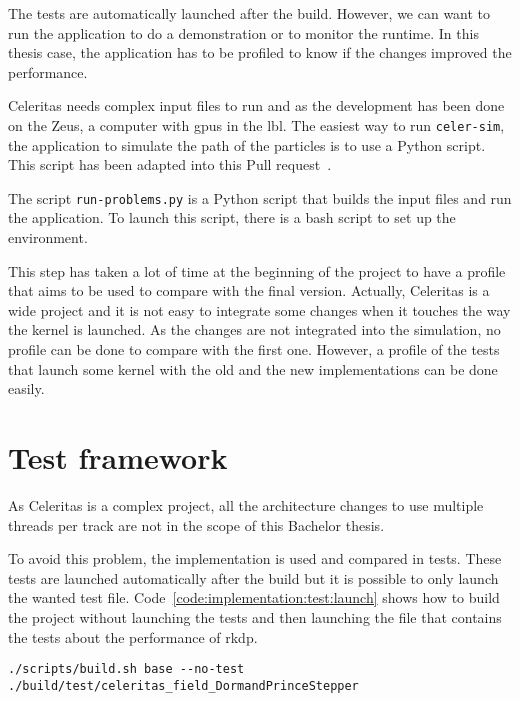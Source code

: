The tests are automatically launched after the build.
However, we can want to run the application to do a demonstration or to
monitor the runtime.
In this thesis case, the application has to be profiled to know if the changes
improved the performance.

Celeritas needs complex input files to run and as the development has been done
on the Zeus, a computer with \acrshort{gpu}s in the \acrshort{lbl}.
The easiest way to run \texttt{celer-sim}, the application to simulate the
path of the particles is to use a Python script.
This script has been adapted into this Pull request~\cite{regression-pull-request}.

The script \texttt{run-problems.py} is a Python script that builds the input
files and run the application.
To launch this script, there is a bash script to set up the environment.

This step has taken a lot of time at the beginning of the project to have a
profile that aims to be used to compare with the final version.
Actually, Celeritas is a wide project and it is not easy to integrate some
changes when it touches the way the kernel is launched.
As the changes are not integrated into the simulation, no profile can be done
to compare with the first one.
However, a profile of the tests that launch some kernel with the old and the new
implementations can be done easily.

\section{Test framework}
\label{ch:implementation:test}

As Celeritas is a complex project, all the architecture changes to use multiple
threads per track are not in the scope of this Bachelor thesis.

To avoid this problem, the implementation is used and compared in tests.
These tests are launched automatically after the build but it is possible to
only launch the wanted test file.
Code~\ref{code:implementation:test:launch} shows how to build the project
without launching the tests and then launching the file that contains the tests
about the performance of \acrshort{rkdp}.

\begin{code}
    \label{code:implementation:test:launch}
    \begin{verbatim}
./scripts/build.sh base --no-test
./build/test/celeritas_field_DormandPrinceStepper
    \end{verbatim}
\end{code}

